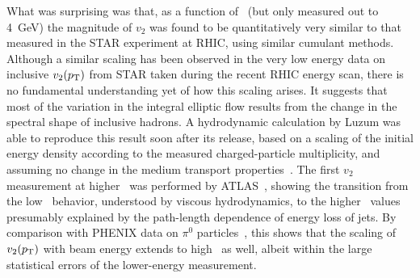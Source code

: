 What was surprising was that, as a function of \pT\ (but only measured out to 4~GeV)
the magnitude of $v_2$ was found to be quantitatively very similar to that measured in
the STAR experiment at RHIC, using similar cumulant methods.
Although a similar scaling has been observed in the very low energy
data on inclusive $v_2(\mbox{$p_{\mathrm{T}}$})$ from STAR taken during the recent RHIC energy scan,
there is no fundamental understanding yet of how this scaling arises.
It suggests that most of the variation in the integral elliptic flow results from the change in the spectral shape
of inclusive hadrons.
A hydrodynamic calculation by Luzum was able to reproduce this result soon after its release,
based on a scaling of the initial energy density according to the measured charged-particle
multiplicity, and assuming no change in the medium transport properties~\cite{Luzum:2010ag}.
The first $v_2$ measurement at higher \pT\ was performed by ATLAS~\cite{ATLAS:2011ah},
showing the transition from the low \pT\ behavior,
understood by viscous hydrodynamics, to the higher \pT\ values presumably explained by the path-length dependence of
energy loss of jets.
By comparison with PHENIX data on $\pi^0$ particles~\cite{Adare:2010sp}, this shows that the scaling of $\mbox{$v_2$}(\mbox{$p_{\mathrm{T}}$})$ with beam energy 
extends to high \pT\ as well,
albeit within the large statistical errors of the lower-energy measurement.

